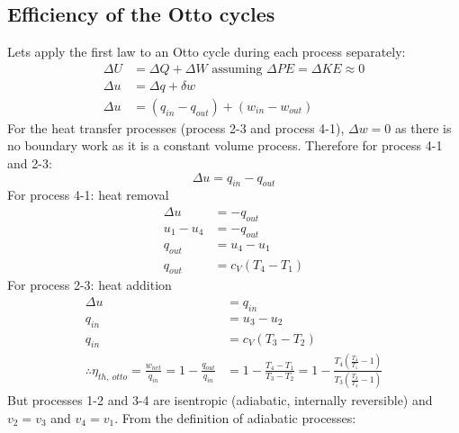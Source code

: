 \subsection{Efficiency of the Otto cycles}
Lets apply the first law to an Otto cycle during each process separately:
\begin{align}
  \Delta U & = \Delta Q + \Delta W \textrm{ assuming } \Delta PE = \Delta KE \approx 0 \\
  \Delta u & = \Delta q + \delta w                                                     \\
  \Delta u & = (q_{in} - q_{out}) + (w_{in} - w_{out})
\end{align}
For the heat transfer processes (process 2-3 and process 4-1), $\Delta w = 0$ as there is no boundary work as it is a constant volume process. Therefore for process 4-1 and 2-3:
\begin{equation}
  \Delta u = q_{in} - q_{out}
\end{equation}
For process 4-1: heat removal
\begin{align}
  \Delta u  & = -q_{out}       \\
  u_1 - u_4 & = - q_{out}      \\
  q_{out}   & = u_4 - u_1      \\
  q_{out}   & = c_V(T_4 - T_1)
\end{align}
For process 2-3: heat addition
\begin{align}
  \Delta u                                                                            & = q_{in}                                                                                                                     \\
  q_{in}                                                                              & = u_3 - u_2                                                                                                                  \\
  q_{in}                                                                              & = c_V(T_3 - T_2)                                                                                                             \\
  \therefore \eta_{th , \ otto} = \frac{w_{net}}{q_{in}} = 1 - \frac{q_{out}}{q_{in}} & = 1 - \frac{T_4 - T_1}{T_3 - T_2} = 1 - \frac{T_4 \left( \frac{T_4}{T_1} -1 \right)}{T_3 \left( \frac{T_3}{T_4} - 1 \right)}
\end{align}
But processes 1-2 and 3-4 are isentropic (adiabatic, internally reversible) and $v_2 = v_3$ and $v_4 = v_1$. From the definition of adiabatic processes:
